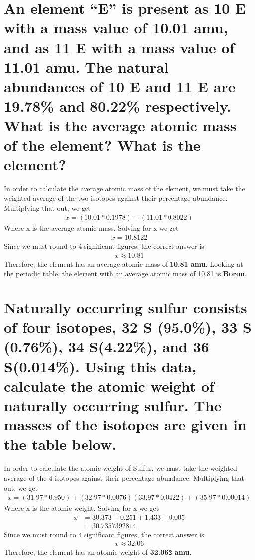 \documentclass[11pt]{article}
\begin{document}
\section{An element “E” is present as 10 E with a mass value of 10.01 amu, and as 11 E with a mass value of 11.01 amu. The natural abundances of 10 E and 11 E are 19.78\% and 80.22\% respectively. What is the average atomic mass of the element? What is the element?}
\label{sec:org6c7abca}
In order to calculate the average atomic mass of the element, we must take the weighted average of the two isotopes against their percentage abundance. Multiplying that out, we get
\begin{align*}
x=(10.01*0.1978)+(11.01*0.8022)
\end{align*}
Where x is the average atomic mass. Solving for x we get
\begin{align*}
x=10.8122
\end{align*}
Since we must round to 4 significant figures, the correct answer is
\begin{align*}
x\approx10.81
\end{align*}
Therefore, the element has an average atomic mass of \textbf{10.81 amu}. Looking at the periodic table, the element with an average atomic mass of 10.81 is \textbf{Boron}.

\section{Naturally occurring sulfur consists of four isotopes, 32 S (95.0\%), 33 S (0.76\%), 34 S(4.22\%), and 36 S(0.014\%). Using this data, calculate the atomic weight of naturally occurring sulfur. The masses of the isotopes are given in the table below.}
\label{sec:orgf1d70a2}
In order to calculate the atomic weight of Sulfur, we must take the weighted average of the 4 isotopes against their percentage abundance. Multiplying that out, we get
\begin{align*}
x=(31.97*0.950)+(32.97*0.0076)(33.97*0.0422)+(35.97*0.00014)
\end{align*}
Where x is the atomic weight. Solving for x we get
\begin{align*}
x&=30.373 + 0.251 + 1.433 + 0.005\\
&=30.7357392814
\end{align*}
Since we must round to 4 significant figures, the correct answer is
\begin{align*}
x\approx32.06
\end{align*}
Therefore, the element has an atomic weight of \textbf{32.062 amu}.
\end{document}
